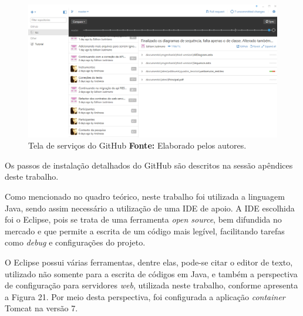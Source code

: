 
\begin{figure}[h!]
	\centerline{\includegraphics[scale=0.35]{./imagens/github.jpg}}
	\caption[Tela de serviços do GitHub ]
	{Tela de serviços do GitHub \textbf{Fonte:} Elaborado pelos autores.}
	\label{fig:exemplo1}
\end{figure}

\par Os passos de instalação detalhados do GitHub são descritos na sessão apêndices deste trabalho.

\par Como mencionado no quadro teórico, neste trabalho foi utilizada a linguagem Java, sendo assim necessário a utilização de uma IDE de apoio. A IDE escolhida foi o Eclipse, pois se trata de uma ferramenta \textit{open source}, bem difundida no mercado e que permite a escrita de um código mais legível, facilitando tarefas como \textit{debug} e configurações do projeto.

\par O Eclipse possui várias ferramentas, dentre elas, pode-se citar o editor de texto, utilizado não somente para a escrita de códigos em Java, e também a perspectiva de configuração para servidores \textit{web}, utilizada neste trabalho, conforme apresenta a Figura 21. Por meio desta perspectiva, foi configurada a aplicação \textit{container} Tomcat na versão 7.

